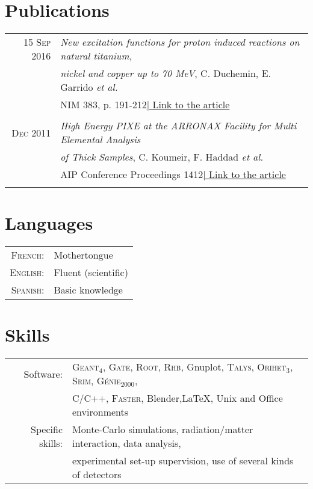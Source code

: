 \documentclass[a4paper,10pt]{article}
\begin{document}
\section{Publications}
\begin{tabular}{r|l}
 \textsc{15 Sep 2016} & \emph{New excitation functions for proton induced reactions on natural titanium,}\\
 &\emph{nickel and copper up to 70 MeV}, C. Duchemin, E. Garrido \emph{et al.}\\
 &NIM 383, p. 191-212\hyperlink{https://doi.org/10.1016/j.nimb.2016.07.011}{\hfill | \footnotesize Link to the article}\\
 \multicolumn{2}{c}{}\\
 \textsc{Dec 2011} & \emph{High Energy PIXE at the ARRONAX Facility for Multi Elemental Analysis}\\
 &\emph{of Thick Samples}, C. Koumeir, F. Haddad \emph{et al.}\\
 &AIP Conference Proceedings 1412\hyperlink{https://doi.org/10.1063/1.3665303}{\hfill | \footnotesize Link to the article}\\
 \multicolumn{2}{c}{}\\
\end{tabular}

\section{Languages}
\begin{tabular}{rl}
 \textsc{French:}&Mothertongue\\
\textsc{English:}&Fluent (scientific)\\
\textsc{Spanish:}&Basic knowledge\\
\end{tabular}

\section{Skills}
\begin{tabular}{rl}
 Software:& \textsc{Geant}$_4$, \textsc{Gate}, \textsc{Root}, \textsc{Rhb}, Gnuplot, \textsc{Talys}, \textsc{Orihet}$_3$, \textsc{Srim}, \textsc{Génie}$_{2000}$,\\
 &C/C++, \textsc{Faster}, Blender,\LaTeX, Unix and Office environments\\
 Specific skills:& Monte-Carlo simulations, radiation/matter interaction, data analysis,\\
 &experimental set-up supervision, use of several kinds of detectors\\
\end{tabular}
\end{document}
